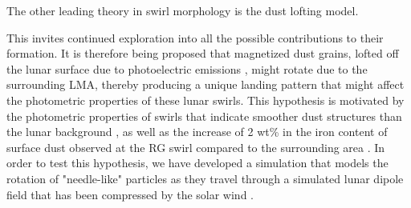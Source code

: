 The other leading theory in swirl morphology is the dust lofting model.  





This invites continued exploration into all the possible contributions to their formation.  It is therefore being proposed that magnetized dust grains, lofted off the lunar surface due to photoelectric emissions \cite{abbas2007lunar}, might rotate due to the surrounding LMA, thereby producing a unique landing pattern that might affect the photometric properties of these lunar swirls.  This hypothesis is motivated by the photometric properties of swirls that indicate smoother dust structures than the lunar background \cite{kaydash2009photometric}, as well as the increase of 2 wt\% in the iron content of surface dust observed at the RG swirl compared to the surrounding area \cite{pinet2000local}.  In order to test this hypothesis, we have developed a simulation that models the rotation of "needle-like" particles as they travel through a simulated lunar dipole field that has been compressed by the solar wind \cite{deca2015general}.